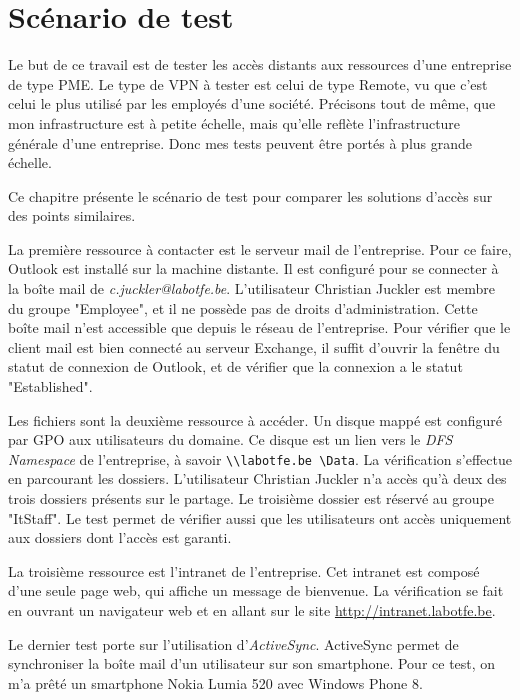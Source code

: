 \section{Scénario de test}
Le but de ce travail est de tester les accès distants aux ressources d'une entreprise de type PME.
Le type de VPN à tester est celui de type Remote, vu que c'est celui le plus utilisé par les employés d'une société.
Précisons tout de même, que mon infrastructure est à petite échelle, mais qu'elle reflète l'infrastructure générale d'une entreprise.
Donc mes tests peuvent être portés à plus grande échelle.

Ce chapitre présente le scénario de test pour comparer les solutions d'accès sur des points similaires.

La première ressource à contacter est le serveur mail de l'entreprise. 
Pour ce faire, Outlook est installé sur la machine distante. 
Il est configuré pour se connecter à la boîte mail de \textit{c.juckler@labotfe.be}.
L'utilisateur Christian Juckler est membre du groupe "Employee", et il ne possède pas de droits d'administration.
Cette boîte mail n'est accessible que depuis le réseau de l'entreprise.
Pour vérifier que le client mail est bien connecté au serveur Exchange, il suffit d'ouvrir la fenêtre du statut de connexion de Outlook, et de vérifier que la connexion a le statut "Established".

Les fichiers sont la deuxième ressource à accéder.
Un disque mappé est configuré par GPO aux utilisateurs du domaine. 
Ce disque est un lien vers le \textit{DFS Namespace} de l'entreprise, à savoir \texttt{\textbackslash\textbackslash labotfe.be \textbackslash Data}.
La vérification s'effectue en parcourant les dossiers.
L'utilisateur Christian Juckler n'a accès qu'à deux des trois dossiers présents sur le partage.
Le troisième dossier est réservé au groupe "ItStaff".
Le test permet de vérifier aussi que les utilisateurs ont accès uniquement aux dossiers dont l'accès est garanti.

La troisième ressource est l'intranet de l'entreprise.
Cet intranet est composé d'une seule page web, qui affiche un message de bienvenue.
La vérification se fait en ouvrant un navigateur web et en allant sur le site \url{http://intranet.labotfe.be}.

Le dernier test porte sur l'utilisation d'\textit{ActiveSync}.
ActiveSync permet de synchroniser la boîte mail d'un utilisateur sur son smartphone.
Pour ce test, on m'a prêté un smartphone Nokia Lumia 520 avec Windows Phone 8.
